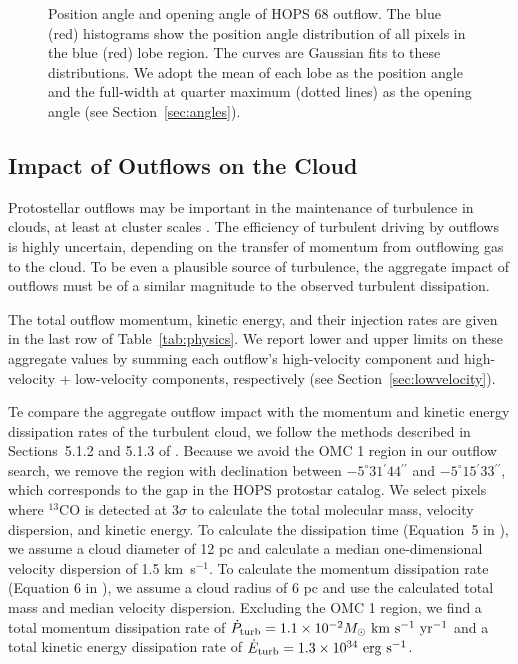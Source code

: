 \documentclass[twocolumn]{aastex63}
\newcommand{\example}{HOPS 68}
\newcommand{\co}[1][]{\ensuremath{^{#1}}CO}
\begin{document}
\begin{figure}
\caption{Position angle and opening angle of \example{} outflow. The blue (red) histograms show the position angle distribution of all pixels in the blue (red) lobe region. The curves are Gaussian fits to these distributions. We adopt the mean of each lobe as the position angle and the full-width at quarter maximum (dotted lines) as the opening angle (see Section~\ref{sec:angles}).\label{fig:angles}}
\end{figure}


\subsection{Impact of Outflows on the Cloud}\label{sec:impact}
Protostellar outflows may be important in the maintenance of turbulence in clouds, at least at cluster scales \citep{Nakamura07}. The efficiency of turbulent driving by outflows is highly uncertain, depending on the transfer of momentum from outflowing gas to the cloud. To be even a plausible source of turbulence, the aggregate impact of outflows must be of a similar magnitude to the observed turbulent dissipation.

The total outflow momentum, kinetic energy, and their injection rates are given in the last row of Table~\ref{tab:physics}. We report lower and upper limits on these aggregate values by summing each outflow's high-velocity component and high-velocity + low-velocity components, respectively (see Section~\ref{sec:lowvelocity}). 

Te compare the aggregate outflow impact with the momentum and kinetic energy dissipation rates of the turbulent cloud, we follow the methods described in Sections~5.1.2 and 5.1.3 of \citet{Feddersen18}. Because we avoid the OMC 1 region in our outflow search, we remove the region with declination between $-5^\circ31{}^\prime44{}^{\prime\prime}$ and $-5^\circ15{}^\prime33{}^{\prime\prime}$, which corresponds to the gap in the HOPS protostar catalog. We select pixels where \co[13] is detected at 3$\sigma$ to calculate the total molecular mass, velocity dispersion, and kinetic energy. To calculate the dissipation time (Equation~5 in \citealp{Feddersen18}), we assume a cloud diameter of 12 pc and calculate a median one-dimensional velocity dispersion of 1.5 km~s$^{-1}$. To calculate the momentum dissipation rate (Equation 6 in \citealp{Feddersen18}), we assume a cloud radius of 6 pc and use the calculated total mass and median velocity dispersion. Excluding the OMC 1 region, we find a total momentum dissipation rate of $\dot P_{\rm turb} = 1.1\times10^{-2}M_\odot~\rm{km}~\rm{s}^{-1}~\rm{yr}^{-1}$ and a total kinetic energy dissipation rate of $\dot E_{\rm turb} = 1.3\times10^{34}~\rm{erg}~\rm{s}^{-1}$.
\end{document}
